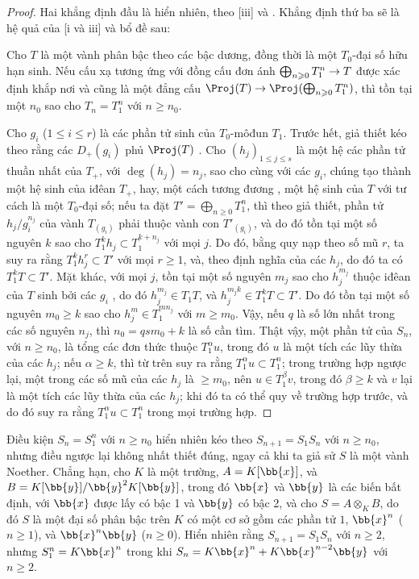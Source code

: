 \documentclass[oneside,10pt]{amsart}
\makeatletter
\renewcommand{\leq}{\leqslant}
\renewcommand{\geq}{\geqslant}
\newcommand{\ega@arrow}[2]{\mathchoice{#1}{#2}{#2}{#2}}
\renewcommand{\to}{\ega@arrow{\longrightarrow}{\rightarrow}}
\newcommand{\oldpage}[2][]{\marginnote{\normalfont\footnotesize\textbf{#1}~|~#2}\ignorespaces}
\let\EGAOriginalLabel\label
\renewcommand{\label}[1]{\phantomsection\EGAOriginalLabel{#1}}
\makeatother
\begin{document}
\begin{proof}
Hai khẳng định đầu là hiển nhiên, theo [iii] và .
Khẳng định thứ ba sẽ là hệ quả của [i và iii] và bổ đề sau:
\begin{lemma}[8.2.14.1]
\label{II.8.2.14.1}
Cho $T$ là một vành phân bậc theo các bậc dương, đồng thời là một $T_0$-đại số hữu hạn sinh.
Nếu cấu xạ tương ứng với đồng cấu đơn ánh $\bigoplus_{n\geq0}T_1^n\to T$ được xác định khắp nơi và cũng là một đẳng cấu $\Proj(T)\to\Proj(\bigoplus_{n\geq0}T_1^n)$, thì tồn tại một $n_0$ sao cho $T_n=T_1^n$ với $n\geq n_0$.
\end{lemma}

Cho $g_i$ ($1\leq i\leq r$) là các phần tử sinh của $T_0$-môđun $T_1$.
Trước hết, giả thiết kéo theo rằng các $D_+(g_i)$ phủ $\Proj(T)$ .
Cho $(h_j)_{1\leq j\leq s}$ là một hệ các phần tử thuần nhất của $T_+$, với $\deg(h_j)=n_j$, sao cho cùng với các $g_i$, chúng tạo thành một hệ sinh của iđêan $T_+$, hay, một cách tương đương , một hệ sinh của $T$ với tư cách là một $T_0$-đại số;
nếu ta đặt $T'=\bigoplus_{n\geq0}T_1^n$, thì theo giả thiết, phần tử $h_j/g_i^{n_j}$ của vành $T_{(g_i)}$ phải thuộc vành con $T'_{(g_i)}$, và do đó tồn tại một số nguyên $k$ sao cho $T_1^k h_j\subset T_1^{k+n_j}$ với mọi $j$.
Do đó, bằng quy nạp theo số mũ $r$, ta suy ra rằng $T_1^k h_j^r \subset T'$ với mọi $r\geq1$, và, theo định nghĩa của các $h_j$, do đó ta có $T_1^k T\subset T'$.
Mặt khác, với mọi $j$, tồn tại một số nguyên $m_j$ sao cho $h_j^{m_j}$ thuộc iđêan của $T$ sinh bởi các $g_i$ , do đó $h_j^{m_j}\in T_1 T$, và
\oldpage[II]{162}
$h_j^{m_j k}\in T_1^k T\subset T'$.
Do đó tồn tại một số nguyên $m_0\geq k$ sao cho $h_j^m\in T_1^{m n_j}$ với $m\geq m_0$.
Vậy, nếu $q$ là số lớn nhất trong các số nguyên $n_j$, thì $n_0=q s m_0+k$ là số cần tìm.
Thật vậy, một phần tử của $S_n$, với $n\geq n_0$, là tổng các đơn thức thuộc $T_1^\alpha u$, trong đó $u$ là một tích các lũy thừa của các $h_j$;
nếu $\alpha\geq k$, thì từ trên suy ra rằng $T_1^\alpha u\subset T_1^n$;
trong trường hợp ngược lại, một trong các số mũ của các $h_j$ là $\geq m_0$, nên $u\in T_1^\beta v$, trong đó $\beta\geq k$ và $v$ lại là một tích các lũy thừa của các $h_j$;
khi đó ta có thể quy về trường hợp trước, và do đó suy ra rằng $T_1^\alpha u\subset T_1^n$ trong mọi trường hợp.
\end{proof}

\begin{remark}[8.2.15]
\label{II.8.2.15}
Điều kiện $S_n=S_1^n$ với $n\geq n_0$ hiển nhiên kéo theo $S_{n+1}=S_1S_n$ với $n\geq n_0$, nhưng điều ngược lại không nhất thiết đúng, ngay cả khi ta giả sử $S$ là một vành Noether.
Chẳng hạn, cho $K$ là một trường, $A=K[\bb{x}]$, và $B=K[\bb{y}]/\bb{y}^2K[\bb{y}]$, trong đó $\bb{x}$ và $\bb{y}$ là các biến bất định, với $\bb{x}$ được lấy có bậc 1 và $\bb{y}$ có bậc 2, và cho $S=A\otimes_K B$, do đó $S$ là một đại số phân bậc trên $K$ có một cơ sở gồm các phần tử $1$, $\bb{x}^n$ ($n\geq1$), và $\bb{x}^n\bb{y}$ ($n\geq0$).
Hiển nhiên rằng $S_{n+1}=S_1S_n$ với $n\geq2$, nhưng $S_1^n=K\bb{x}^n$ trong khi $S_n=K\bb{x}^n+K\bb{x}^{n-2}\bb{y}$ với $n\geq2$.
\end{remark}
\end{document}
